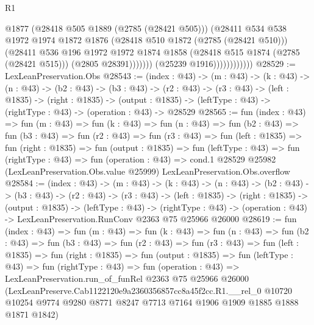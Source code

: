 \begin{lexlean}{R1}
\begin{coremodule}
                                  @1877
                                  (@28418 @505 @1889 (@2785 (@28421 @505)))
                                  (@28411
                                    @534
                                    @538
                                    @1972
                                    @1974
                                    @1872
                                    @1876
                                    (@28418 @510 @1872 (@2785 (@28421 @510)))
                                    (@28411
                                      @536
                                      @196
                                      @1972
                                      @1972
                                      @1874
                                      @1858
                                      (@28418 @515 @1874 (@2785 (@28421 @515)))
                                      (@2805 @28391)))))))
                          (@25239 @1916))))))))))))
@28529 := LexLeanPreservation.Obs
@28543 := (index : @43) ->
  (m : @43) ->
  (k : @43) ->
  (n : @43) ->
  (b2 : @43) ->
  (b3 : @43) ->
  (r2 : @43) ->
  (r3 : @43) ->
  (left : @1835) ->
  (right : @1835) ->
  (output : @1835) -> (leftType : @43) -> (rightType : @43) -> (operation : @43) -> @28529
@28565 := fun (index : @43) =>
  fun (m : @43) =>
  fun (k : @43) =>
  fun (n : @43) =>
  fun (b2 : @43) =>
  fun (b3 : @43) =>
  fun (r2 : @43) =>
  fun (r3 : @43) =>
  fun (left : @1835) =>
  fun (right : @1835) =>
  fun (output : @1835) =>
  fun (leftType : @43) =>
  fun (rightType : @43) =>
  fun (operation : @43) =>
  cond.{1} @28529 @25982 (LexLeanPreservation.Obs.value @25999) LexLeanPreservation.Obs.overflow
@28584 := (index : @43) ->
  (m : @43) ->
  (k : @43) ->
  (n : @43) ->
  (b2 : @43) ->
  (b3 : @43) ->
  (r2 : @43) ->
  (r3 : @43) ->
  (left : @1835) ->
  (right : @1835) ->
  (output : @1835) ->
  (leftType : @43) ->
  (rightType : @43) -> (operation : @43) -> LexLeanPreservation.RunConv @2363 @75 @25966 @26000
@28619 := fun (index : @43) =>
  fun (m : @43) =>
  fun (k : @43) =>
  fun (n : @43) =>
  fun (b2 : @43) =>
  fun (b3 : @43) =>
  fun (r2 : @43) =>
  fun (r3 : @43) =>
  fun (left : @1835) =>
  fun (right : @1835) =>
  fun (output : @1835) =>
  fun (leftType : @43) =>
  fun (rightType : @43) =>
  fun (operation : @43) =>
  LexLeanPreservation.run_of_funRel
    @2363
    @75
    @25966
    @26000
    (LexLeanPreserve.Cab1122120e9a2360356857cc8a45f2cc.R1.__rel_0
      @10720
      @10254
      @9774
      @9280
      @8771
      @8247
      @7713
      @7164
      @1906
      @1909
      @1885
      @1888
      @1871
      @1842)
\end{coremodule}
\end{lexlean}
